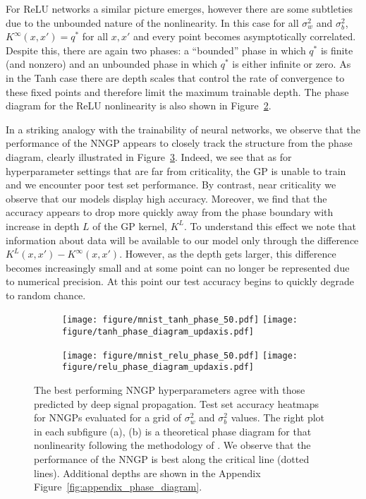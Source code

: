 \documentclass{article} %
\begin{document}
For ReLU networks a similar picture emerges, however there are some subtleties due to the unbounded nature of the nonlinearity. In this case for all $\sigma_w^2$ and $\sigma_b^2$, $K^\infty(x,x') = q^*$ for all $x,x'$ and every point becomes asymptotically correlated. Despite this, there are again two phases: a ``bounded'' phase in which $q^*$ is finite (and nonzero) and an unbounded phase in which $q^*$ is either infinite or zero. As in the Tanh case there are depth scales that control the rate of convergence to these fixed points and therefore limit the maximum trainable depth. The phase diagram for the ReLU nonlinearity is also shown in Figure~\ref{fig:relu_phase}.

In a striking analogy with the trainability of neural networks, we observe that the performance of the NNGP appears to closely track the structure from the phase diagram, clearly illustrated in Figure~\ref{fig:phase_diagram}. Indeed, we see that as for hyperparameter settings that are far from criticality, the GP is unable to train and we encounter poor test set performance. By contrast, near criticality we observe that our models display high accuracy. Moreover, we find that the accuracy appears to drop more quickly away from the phase boundary with increase in depth $L$ of the GP kernel, $K^{L}$. To understand this effect we note that information about data will be available to our model only through the difference $K^L(x,x') - K^\infty(x,x')$. However, as the depth gets larger, this difference becomes increasingly small and at some point can no longer be represented due to numerical precision. At this point our test accuracy begins to quickly degrade to random chance.


\begin{figure}[ht]
  \begin{subfigure}[b]{0.5\textwidth}
  \texttt{[image: figure/mnist\_tanh\_phase\_50.pdf]}
  \texttt{[image: figure/tanh\_phase\_diagram\_updaxis.pdf]}
   \label{fig:tanh_phase}
  \end{subfigure}
  \begin{subfigure}[b]{0.5\textwidth}
 \texttt{[image: figure/mnist\_relu\_phase\_50.pdf]}
 \texttt{[image: figure/relu\_phase\_diagram\_updaxis.pdf]}
   \label{fig:relu_phase}
  \end{subfigure}
  
  \caption{The best performing NNGP hyperparameters agree with those predicted by deep signal propagation. Test set accuracy heatmaps for NNGPs evaluated for a grid of $\sigma_w^2$ and $\sigma_b^2$ values. The right plot in each subfigure (a), (b) is a theoretical phase diagram for that nonlinearity following the methodology of \cite{schoenholz2016}. We observe that the performance of the NNGP is best along the critical line (dotted lines). Additional depths are shown in the Appendix Figure~\ref{fig:appendix_phase_diagram}.
  }
  \label{fig:phase_diagram}
\end{figure}
\end{document}
